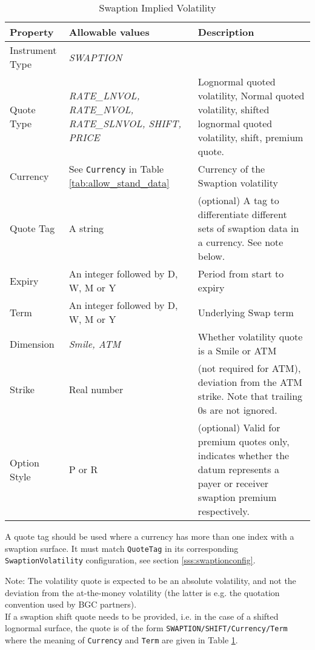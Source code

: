 \begin{table}[H]
\centering
  \begin{tabular}{|p{3cm}|p{3.5cm}|p{7cm}|}
    \hline
    {\bf Property} & {\bf Allowable values} & {\bf Description} \\ \hline
    Instrument Type & \emph{SWAPTION} & \\ \hline
    Quote Type & \emph{RATE\_LNVOL, RATE\_NVOL, RATE\_SLNVOL, SHIFT, PRICE} & Lognormal quoted volatility, Normal quoted volatility, shifted lognormal quoted volatility, shift, premium quote.\\ \hline
    Currency & See \lstinline!Currency! in Table \ref{tab:allow_stand_data}&  Currency of the Swaption volatility\\ \hline
    Quote Tag & A string & (optional) A tag to differentiate different sets of swaption data in a currency. See note below. \\ \hline
    Expiry & An integer followed by D, W, M or Y & Period from start to expiry \\ \hline
    Term & An integer followed by D, W, M or Y & Underlying Swap term \\ \hline
    Dimension & \emph{Smile, ATM}  & Whether volatility quote is a Smile or ATM \\ \hline
    Strike & Real number & (not required for ATM), deviation from the ATM strike. Note that trailing 0s are not ignored.\\ \hline
    Option Style & P or R & (optional) Valid for premium quotes only, indicates whether the datum represents a payer or receiver swaption premium respectively. \\ \hline
  \end{tabular}
  \caption{Swaption Implied Volatility}
  \label{tab:swaptimplvol_quote}
\end{table}

\medskip A quote tag should be used where a currency has more than one index with a swaption surface. It must match \lstinline!QuoteTag! in its corresponding \lstinline!SwaptionVolatility! configuration, see section \ref{sss:swaptionconfig}.

Note: The volatility quote is expected to be an absolute volatility, and not the deviation from the
at-the-money volatility (the latter is e.g. the quotation convention used by BGC partners).\\
If a swaption shift quote needs to be provided, i.e. in the case of a shifted lognormal surface, the quote is of the form \lstinline!SWAPTION/SHIFT/Currency/Term! where the meaning of \lstinline!Currency! and \lstinline!Term! are given in Table \ref{tab:swaptimplvol_quote}.


